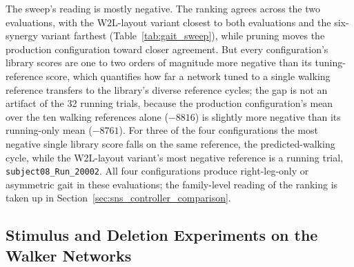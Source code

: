 The sweep's reading is mostly negative. The ranking agrees across the two evaluations, with the W2L-layout variant closest to both evaluations and the six-synergy variant farthest (Table~\ref{tab:gait_sweep}), while pruning moves the production configuration toward closer agreement. But every configuration's library scores are one to two orders of magnitude more negative than its tuning-reference score, which quantifies how far a network tuned to a single walking reference transfers to the library's diverse reference cycles; the gap is not an artifact of the 32 running trials, because the production configuration's mean over the ten walking references alone ($-8816$) is slightly more negative than its running-only mean ($-8761$). For three of the four configurations the most negative single library score falls on the same reference, the predicted-walking cycle, while the W2L-layout variant's most negative reference is a running trial, \texttt{subject08\_Run\_20002}. All four configurations produce right-leg-only or asymmetric gait in these evaluations; the family-level reading of the ranking is taken up in Section~\ref{sec:sns_controller_comparison}.

\subsection{Stimulus and Deletion Experiments on the Walker Networks}\label{sec:walker_variant_results}

